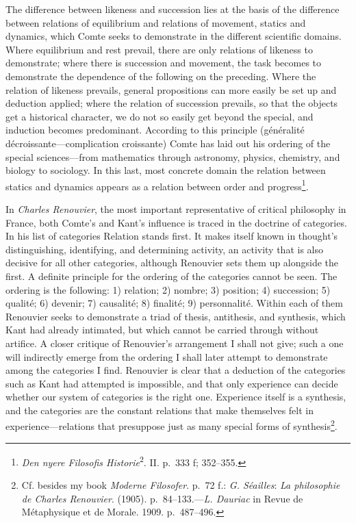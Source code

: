 \documentclass[12pt,a4paper]{book}
\newcommand{\opage}[1]{\marginnote{\footnotesize\textit{[#1]}}}
\begin{document}
The difference between likeness and succession lies at the basis of the
difference between relations of equilibrium and relations of movement,
statics and dynamics, which Comte seeks to demonstrate in the different
scientific domains. Where equilibrium and rest prevail, there are only
relations of likeness to demonstrate; where there is succession and movement,
the task becomes to demonstrate the dependence of the following on the
preceding. Where the relation of likeness prevails, general propositions can
more easily be set up and deduction applied; where the relation of succession
prevails, so that the objects get a historical character, we do not so easily
get beyond the special, and induction becomes predominant. According to this
principle (généralité décroissante---complication croissante) Comte has laid
out his ordering of the special sciences---from mathematics through astronomy,
physics, chemistry, and biology to sociology. In this last, most concrete
domain the relation between statics and dynamics appears as a relation
between order and progress\footnote{\emph{Den nyere Filosofis
Historie}\textsuperscript{2}. II. p.~333 f; 352--355.}.

In \emph{Charles Renouvier}, the most important representative of critical
philosophy in France, both Comte's and Kant's influence is traced in the
doctrine of categories. In his list of categories Relation stands first. It
makes itself known in \opage{152}thought's distinguishing, identifying, and determining
activity, an activity that is also decisive for all other categories, although
Renouvier sets them up alongside the first. A definite principle for the
ordering of the categories cannot be seen. The ordering is the following: 1)
relation; 2) nombre; 3) position; 4) succession; 5) qualité; 6) devenir; 7)
causalité; 8) finalité; 9) personnalité. Within each of them Renouvier seeks
to demonstrate a triad of thesis, antithesis, and synthesis, which Kant had
already intimated, but which cannot be carried through without artifice. A
closer critique of Renouvier's arrangement I shall not give; such a one will
indirectly emerge from the ordering I shall later attempt to demonstrate
among the categories I find. Renouvier is clear that a deduction of the
categories such as Kant had attempted is impossible, and that only experience
can decide whether our system of categories is the right one. Experience
itself is a synthesis, and the categories are the constant relations that make
themselves felt in experience---relations that presuppose just as many
special forms of synthesis\footnote{Cf. besides my book \emph{Moderne
Filosofer}. p.~72 f.: \emph{G. Séailles}: \emph{La philosophie de Charles
Renouvier}. (1905). p.~84--133.---\emph{L. Dauriac} in Revue de Métaphysique
et de Morale. 1909. p.~487--496.}.
\end{document}
